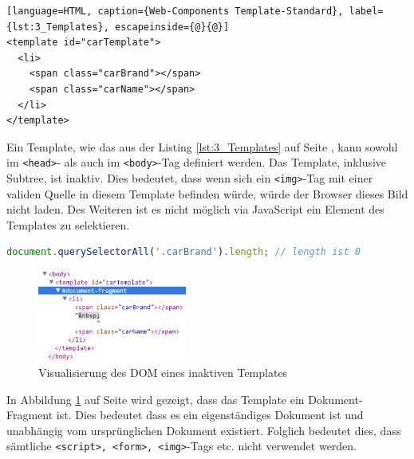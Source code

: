 \begin{lstlisting}[language=HTML, caption={Web-Components Template-Standard}, label={lst:3_Templates}, escapeinside={@}{@}]
<template id="carTemplate">
  <li>
    <span class="carBrand"></span>
    <span class="carName"></span>
  </li>
</template>
\end{lstlisting}

Ein Template, wie das aus der Listing \ref{lst:3_Templates} auf Seite \pageref{lst:3_Templates}, kann sowohl im \lstinline|<head>|- als auch im \lstinline|<body>|-Tag definiert werden. Das Template, inklusive Subtree, ist inaktiv. Dies bedeutet, dass wenn sich ein \lstinline|<img>|-Tag mit einer validen Quelle in diesem Template befinden würde, würde der Browser dieses Bild nicht laden. Des Weiteren ist es nicht möglich via JavaScript ein Element des Templates zu selektieren.
\begin{lstlisting}[language=JavaScript, caption={Beispiel-Selektor eines Elements in einem Template, das nicht aktiven DOM ist}, label={lst:3_Selector_Example}]
  document.querySelectorAll('.carBrand').length; // length ist 0
\end{lstlisting}

\begin{figure}[h]
\centering
\includegraphics[height=3.0cm]{images/document_fragment.png}
\caption[
Visualisierung des DOM eines inaktiven Templates, Urldate: 04.2014 \newline
\small\texttt{http://www.prevent-default.com/wp-content/uploads/2013/04/document-fragment-300x132.png}
]{Visualisierung des DOM eines inaktiven Templates}
\label{fig:3_inactive_Template_DOM}
\end{figure}

In Abbildung \ref{fig:3_inactive_Template_DOM} auf Seite \pageref{fig:3_inactive_Template_DOM} wird gezeigt, dass das Template ein Dokument-Fragment ist. Dies bedeutet dass es ein eigenständiges Dokument ist und unabhängig vom ursprünglichen Dokument existiert. Folglich bedeutet dies, dass sämtliche \lstinline|<script>, <form>, <img>|-Tags etc. nicht verwendet werden.

